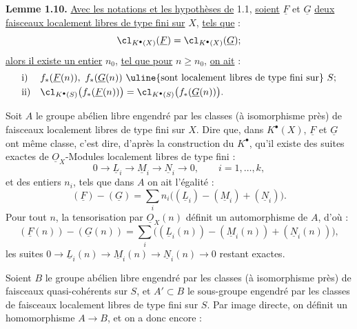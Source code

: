 
\textbf{Lemme 1.10.} \uline{Avec les notations et les hypothèses de} 1.1, \uline{soient} \(\underline{F}\) et \(\underline{G}\) \uline{deux faisceaux localement libres de type fini sur} \(X\), \uline{tels que} :
\[
  \cl_{K^{\bullet}(X)}(\underline{F})=\cl_{K^{\bullet}(X)}(\underline{G});
\]
\uline{alors il existe un entier} \(n_0\), \uline{tel que pour} \(n\geq n_0\), \uline{on ait} :
\[
\begin{array}{ll}
\text{i)}& f_*(\underline{F}(n)),\ f_*(\underline{G}(n))\text{ \uline{sont localement libres de type fini sur} }S;\\[1mm]
\text{ii)}& \cl_{K^{\bullet}(S)}\bigl(f_*(\underline{F}(n))\bigr)=\cl_{K^{\bullet}(S)}\bigl(f_*(\underline{G}(n))\bigr).
\end{array}
\]

Soit \(A\) le groupe abélien libre engendré par les classes (à isomorphisme près) de faisceaux localement libres de type fini sur \(X\). Dire que, dans \(K^{\bullet}(X)\), \(\underline{F}\) et \(\underline{G}\) ont même classe, c'est dire, d'après la construction du \(K^{\bullet}\), qu'il existe des suites exactes de \(\underline{O}_X\)-Modules localement libres de type fini :
\[
  0\longrightarrow \underline{L}_i\longrightarrow \underline{M}_i\longrightarrow \underline{N}_i\longrightarrow 0,
  \qquad i=1,\ldots,k,
\]
et des entiers \(n_i\), tels que dans \(A\) on ait l'égalité :
\[
  (\underline{F})-(\underline{G})=\sum_i n_i\bigl((\underline{L}_i)-(\underline{M}_i)+(\underline{N}_i)\bigr).
\]
Pour tout \(n\), la tensorisation par \(\underline{O}_X(n)\) définit un automorphisme de \(A\), d'où :
\[
  (\underline{F}(n))-(\underline{G}(n))=\sum_i \bigl((\underline{L}_i(n))-(\underline{M}_i(n))+(\underline{N}_i(n))\bigr),
\]
les suites \(0\to \underline{L}_i(n)\to \underline{M}_i(n)\to \underline{N}_i(n)\to0\) restant exactes.

Soient \(B\) le groupe abélien libre engendré par les classes (à isomorphisme près) de faisceaux quasi-cohérents sur \(S\), et \(A'\subset B\) le sous-groupe engendré par les classes de faisceaux localement libres de type fini sur \(S\). Par image directe, on définit un homomorphisme \(A\to B\), et on a donc encore :
